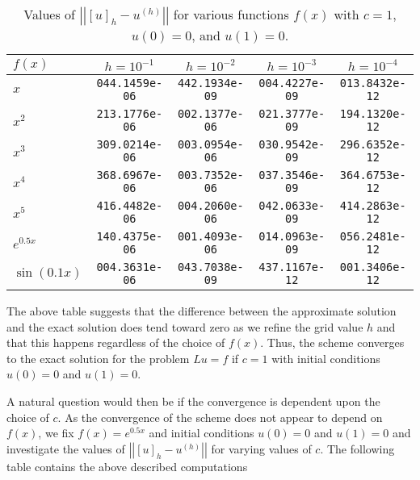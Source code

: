 \begin{table}[h!]
  \centering
  \bgroup
  \def\arraystretch{1.5}
  \begin{tabular}{| l | c | c | c | c |}
    \hline
    $f(x)$ & $h = 10^{-1}$ & $h = 10^{-2}$ & $h = 10^{-3}$ & $h = 10^{-4}$ \\
    \hline
    $x$ & \texttt{044.1459e-06} & \texttt{442.1934e-09} & \texttt{004.4227e-09} & \texttt{013.8432e-12} \\
    $x^2$ & \texttt{213.1776e-06} & \texttt{002.1377e-06} & \texttt{021.3777e-09} & \texttt{194.1320e-12} \\
    $x^3$ & \texttt{309.0214e-06} & \texttt{003.0954e-06} & \texttt{030.9542e-09} & \texttt{296.6352e-12} \\
    $x^4$ & \texttt{368.6967e-06} & \texttt{003.7352e-06} & \texttt{037.3546e-09} & \texttt{364.6753e-12} \\
    $x^5$ & \texttt{416.4482e-06} & \texttt{004.2060e-06} & \texttt{042.0633e-09} & \texttt{414.2863e-12} \\
    $e^{0.5x}$ & \texttt{140.4375e-06} & \texttt{001.4093e-06} & \texttt{014.0963e-09} & \texttt{056.2481e-12} \\
    $\sin(0.1x)$ &  \texttt{004.3631e-06} & \texttt{043.7038e-09} & \texttt{437.1167e-12} & \texttt{001.3406e-12} \\
    \hline
  \end{tabular}
  \egroup
  \caption{Values of $\left|\left|[u]_h - u^{(h)}\right|\right|$ for various functions
    $f(x)$ with $c = 1$, $u(0) = 0$, and $u(1) = 0$.}
\end{table}

The above table suggests that the difference between the approximate solution
and the exact solution does tend toward zero as we refine the grid value $h$ and
that this happens regardless of the choice of $f(x)$. Thus, the scheme converges
to the exact solution for the problem $Lu = f$ if $c=1$ with initial conditions
$u(0) = 0$ and $u(1) = 0$.

A natural question would then be if the convergence is dependent upon the choice
of $c$. As the convergence of the scheme does not appear to depend on $f(x)$, we
fix $f(x) = e^{0.5x}$ and initial conditions $u(0) = 0$ and $u(1) = 0$ and investigate
the values of $\left|\left|[u]_h - u^{(h)}\right|\right|$ for varying values of $c$.
The following table contains the above described computations

